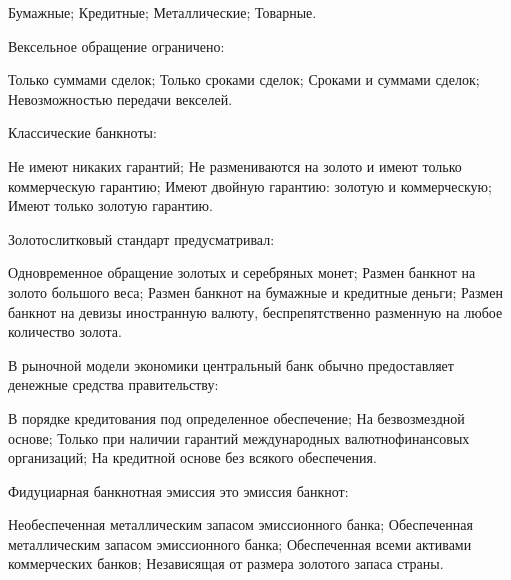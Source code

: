 \documentclass[12pt, table]{exam}
\begin{document}
\begin{questions}
\begin{multicols}{2}
	 \begin{choices}
	 \CC Бумажные;
	 \choice Кредитные;
	 \choice Металлические;
	 \choice Товарные.
	 \end{choices}
\question Вексельное обращение ограничено:
	 \begin{choices}
	 \CC Только суммами сделок;
	 \choice Только сроками сделок;
	 \choice Сроками и суммами сделок;
	 \choice Невозможностью передачи векселей.
	 \end{choices}
\question Классические банкноты:
	 \begin{choices}
	 \choice Не имеют никаких гарантий;
	 \choice Не размениваются на золото и имеют только коммерческую гарантию;
	 \CC Имеют двойную гарантию: золотую и коммерческую;
	 \choice Имеют только золотую гарантию.
	 \end{choices}
\question Золотослитковый стандарт предусматривал:
	 \begin{choices}
	 \choice Одновременное обращение золотых и серебряных монет;
	 \choice Размен банкнот на золото большого веса;
	 \CC Размен банкнот на бумажные и кредитные деньги;
	 \choice Размен банкнот на девизы  иностранную валюту, беспрепятственно разменную на любое количество золота.
	 \end{choices}
\question В рыночной модели экономики центральный банк обычно предоставляет денежные средства правительству:
	 \begin{choices}
	 \choice В порядке кредитования под определенное обеспечение;
	 \choice На безвозмездной основе;
	 \CC Только при наличии гарантий международных валютнофинансовых организаций;
	 \choice На кредитной основе без всякого обеспечения.
	 \end{choices}
\question Фидуциарная банкнотная эмиссия  это эмиссия банкнот:
	 \begin{choices}
	 \choice Необеспеченная металлическим запасом эмиссионного банка;
	 \choice Обеспеченная металлическим запасом эмиссионного банка;
	 \CC Обеспеченная всеми активами коммерческих банков;
	 \choice Независящая от размера золотого запаса страны.
	 \end{choices}



\end{multicols}
\end{questions}
\end{document}
